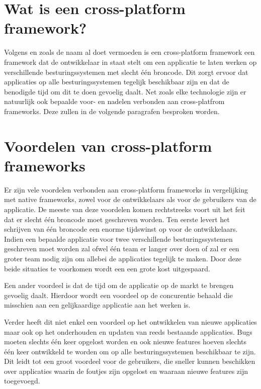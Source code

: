 \section{Wat is een cross-platform framework?}

 Volgens \textcite{El-Kassas2014} en zoals de naam al doet vermoeden is een cross-platform framework een framework dat de ontwikkelaar in staat stelt om een applicatie te laten werken op verschillende besturingssystemen met slecht één broncode. Dit zorgt ervoor dat applicaties op alle besturingssystemen tegelijk beschikbaar zijn en dat de benodigde tijd om dit te doen gevoelig daalt. Net zoals elke technologie zijn er natuurlijk ook bepaalde voor- en nadelen verbonden aan cross-platfrom frameworks. Deze zullen in de volgende paragrafen besproken worden.
 
\section{Voordelen van cross-platform frameworks}

Er zijn vele voordelen verbonden aan cross-platform frameworks in vergelijking met native frameworks, zowel voor de ontwikkelaars als voor de gebruikers van de applicatie. De meeste van deze voordelen komen rechtstreeks voort uit het feit dat er slecht één broncode moet geschreven worden. Ten eerste levert het schrijven van één broncode een enorme tijdswinst op voor de ontwikkelaars. Indien een bepaalde applicatie voor twee verschillende besturingssystemen geschreven moet worden zal ofwel één team er langer over doen of zal er een groter team nodig zijn om allebei de applicaties tegelijk te maken. Door deze beide situaties te voorkomen wordt een een grote kost uitgespaard. 

Een ander voordeel is dat de tijd om de applicatie op de markt te brengen gevoelig daalt. Hierdoor wordt een voordeel op de concurentie behaald die misschien aan een gelijkaardige applicatie aan het werken is. 

Verder heeft dit niet enkel een voordeel op het ontwikkelen van nieuwe applicaties maar ook op het onderhouden en updaten van reeds bestaande applicaties. Bugs moeten slechts één keer opgelost worden en ook nieuwe features hoeven slechts één keer ontwikkeld te worden om op alle besturingssystemen beschikbaar te zijn. Dit leidt tot een groot voordeel voor de gebruikers, die sneller kunnen beschikken over applicaties waarin de foutjes zijn opgelost en waaraan nieuwe features zijn toegevoegd. 

